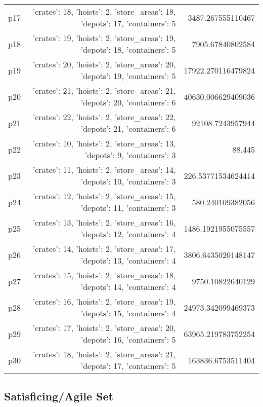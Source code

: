 \documentclass{article}
\begin{document}
\begin{center}
\begin{tabular}{r|r|r}
  p17&{'crates': 18, 'hoists': 2, 'store\_areas': 18, 'depots': 17, 'containers': 5}&3487.267555110467\\
  p18&{'crates': 19, 'hoists': 2, 'store\_areas': 19, 'depots': 18, 'containers': 5}&7905.67840802584\\
  p19&{'crates': 20, 'hoists': 2, 'store\_areas': 20, 'depots': 19, 'containers': 5}&17922.270116479824\\
  p20&{'crates': 21, 'hoists': 2, 'store\_areas': 21, 'depots': 20, 'containers': 6}&40630.006629409036\\
  p21&{'crates': 22, 'hoists': 2, 'store\_areas': 22, 'depots': 21, 'containers': 6}&92108.7243957944\\
  p22&{'crates': 10, 'hoists': 2, 'store\_areas': 13, 'depots': 9, 'containers': 3}&88.445\\
  p23&{'crates': 11, 'hoists': 2, 'store\_areas': 14, 'depots': 10, 'containers': 3}&226.53771534624414\\
  p24&{'crates': 12, 'hoists': 2, 'store\_areas': 15, 'depots': 11, 'containers': 3}&580.240109382056\\
  p25&{'crates': 13, 'hoists': 2, 'store\_areas': 16, 'depots': 12, 'containers': 4}&1486.1921955075557\\
  p26&{'crates': 14, 'hoists': 2, 'store\_areas': 17, 'depots': 13, 'containers': 4}&3806.6435020148147\\
  p27&{'crates': 15, 'hoists': 2, 'store\_areas': 18, 'depots': 14, 'containers': 4}&9750.10822640129\\
  p28&{'crates': 16, 'hoists': 2, 'store\_areas': 19, 'depots': 15, 'containers': 4}&24973.342099469373\\
  p29&{'crates': 17, 'hoists': 2, 'store\_areas': 20, 'depots': 16, 'containers': 5}&63965.219783752254\\
  p30&{'crates': 18, 'hoists': 2, 'store\_areas': 21, 'depots': 17, 'containers': 5}&163836.6753511404
                            \end{tabular}
                            \end{center}
                    

                                \subsection*{Satisficing/Agile Set}
                                
\end{document}
